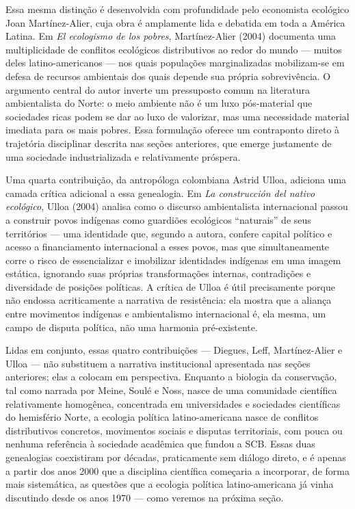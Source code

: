 \documentclass[
  portuguese,
  letterpaper,
  DIV=11,
  numbers=noendperiod]{scrartcl}
\begin{document}
Essa mesma distinção é desenvolvida com profundidade pelo economista
ecológico Joan Martínez-Alier, cuja obra é amplamente lida e debatida em
toda a América Latina. Em \emph{El ecologismo de los pobres},
Martínez-Alier (2004) documenta uma multiplicidade de conflitos
ecológicos distributivos ao redor do mundo --- muitos deles
latino-americanos --- nos quais populações marginalizadas mobilizam-se
em defesa de recursos ambientais dos quais depende sua própria
sobrevivência. O argumento central do autor inverte um pressuposto comum
na literatura ambientalista do Norte: o meio ambiente não é um luxo
pós-material que sociedades ricas podem se dar ao luxo de valorizar, mas
uma necessidade material imediata para os mais pobres. Essa formulação
oferece um contraponto direto à trajetória disciplinar descrita nas
seções anteriores, que emerge justamente de uma sociedade
industrializada e relativamente próspera.

Uma quarta contribuição, da antropóloga colombiana Astrid Ulloa,
adiciona uma camada crítica adicional a essa genealogia. Em \emph{La
construcción del nativo ecológico}, Ulloa (2004) analisa como o discurso
ambientalista internacional passou a construir povos indígenas como
guardiões ecológicos ``naturais'' de seus territórios --- uma identidade
que, segundo a autora, confere capital político e acesso a financiamento
internacional a esses povos, mas que simultaneamente corre o risco de
essencializar e imobilizar identidades indígenas em uma imagem estática,
ignorando suas próprias transformações internas, contradições e
diversidade de posições políticas. A crítica de Ulloa é útil
precisamente porque não endossa acriticamente a narrativa de
resistência: ela mostra que a aliança entre movimentos indígenas e
ambientalismo internacional é, ela mesma, um campo de disputa política,
não uma harmonia pré-existente.

Lidas em conjunto, essas quatro contribuições --- Diegues, Leff,
Martínez-Alier e Ulloa --- não substituem a narrativa institucional
apresentada nas seções anteriores; elas a colocam em perspectiva.
Enquanto a biologia da conservação, tal como narrada por Meine, Soulé e
Noss, nasce de uma comunidade científica relativamente homogênea,
concentrada em universidades e sociedades científicas do hemisfério
Norte, a ecologia política latino-americana nasce de conflitos
distributivos concretos, movimentos sociais e disputas territoriais, com
pouca ou nenhuma referência à sociedade acadêmica que fundou a SCB.
Essas duas genealogias coexistiram por décadas, praticamente sem diálogo
direto, e é apenas a partir dos anos 2000 que a disciplina científica
começaria a incorporar, de forma mais sistemática, as questões que a
ecologia política latino-americana já vinha discutindo desde os anos
1970 --- como veremos na próxima seção.
\end{document}
